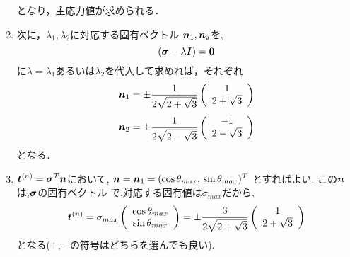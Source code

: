 \documentclass[10pt,a4j]{jarticle}
\begin{document}
\begin{enumerate}
\begin{equation}
\end{equation}
となり，主応力値が求められる．
\item
次に，$\lambda_1, \lambda_2$に対応する固有ベクトル
$\mbox{\boldmath $n$}_1,\mbox{\boldmath $n$}_2$を, 
\begin{equation}
	\left( \mbox{\boldmath $\sigma$}-\lambda \mbox{\boldmath $I$} \right)=\mbox{\boldmath $0$}	
\end{equation}
に$\lambda=\lambda_1$あるいは$\lambda_2$を代入して求めれば，それぞれ
\begin{equation}
	\mbox{\boldmath $n$}_1= 
	\pm \frac{1}{2\sqrt{2+\sqrt{3}}}
	\left( 
		\begin{array}{c}
			1 \\
			2+\sqrt{3} 
		\end{array}
	\right)
\end{equation}
\begin{equation}
	\mbox{\boldmath $n$}_2= 
	\pm \frac{1}{2\sqrt{2-\sqrt{3}}}
	\left( 
		\begin{array}{c}
			-1 \\
			2-\sqrt{3} 
		\end{array}
	\right)
\end{equation}
となる．
\item
$\mbox{\boldmath $t$}^{(n)}=\mbox{\boldmath $\sigma$}^T \mbox{\boldmath $n$}$において,  
$\mbox{\boldmath $n$}=\mbox{\boldmath $n$}_1=(\cos\theta_{max},\,\sin\theta_{max})^T$
とすればよい. この$\mbox{\boldmath $n$}$は,$\mbox{\boldmath $\sigma$}$の固有ベクトル
で,対応する固有値は$\sigma_{max}$だから,
\begin{equation}
	\mbox{\boldmath $t$}^{(n)}=\sigma_{max}
		\left(
		\begin{array}{c}
			\cos \theta_{max} \\	
			\sin \theta_{max} 
		\end{array}
		\right)
		=
		\pm \frac{3}{2\sqrt{2+\sqrt{3}}}
		\left(
		\begin{array}{c}
			1 \\
			2+\sqrt{3}
		\end{array}
		\right)
\end{equation}
となる($+,-$の符号はどちらを選んでも良い).
\end{enumerate}
\end{document}

